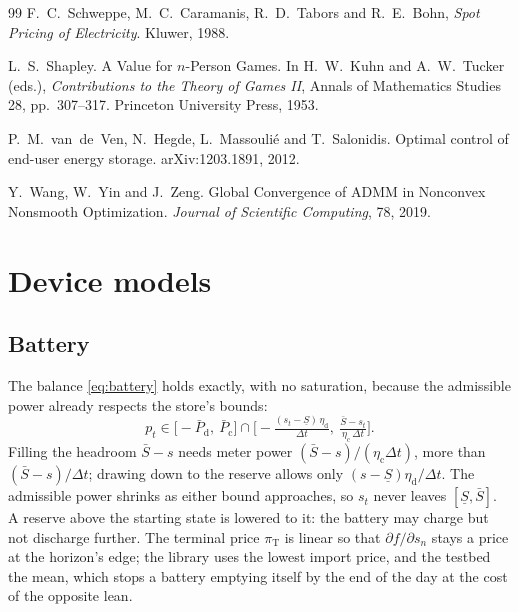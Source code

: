 \documentclass[11pt,a4paper]{article}
\newcommand{\Ec}{\eta_{\mathrm c}}
\newcommand{\Ed}{\eta_{\mathrm d}}
\newcommand{\dt}{\Delta t}
\begin{document}
\begin{thebibliography}{99}
F.~C.~Schweppe, M.~C.~Caramanis, R.~D.~Tabors and R.~E.~Bohn,
\emph{Spot Pricing of Electricity}. Kluwer, 1988.

L.~S.~Shapley.
\newblock A Value for $n$-Person Games.
\newblock In H.~W.~Kuhn and A.~W.~Tucker (eds.), \emph{Contributions to the
Theory of Games II}, Annals of Mathematics Studies 28, pp.~307--317. Princeton
University Press, 1953.

P.~M.~van~de~Ven, N.~Hegde, L.~Massouli\'e and T.~Salonidis.
\newblock Optimal control of end-user energy storage.
\newblock arXiv:1203.1891, 2012.

Y.~Wang, W.~Yin and J.~Zeng.
\newblock Global Convergence of ADMM in Nonconvex Nonsmooth Optimization.
\newblock \emph{Journal of Scientific Computing}, 78, 2019.

\end{thebibliography}

\appendix

\section{Device models}
\label{app:models}

\subsection{Battery}
\label{app:battery}

The balance \eqref{eq:battery} holds exactly, with no saturation, because the
admissible power already respects the store's bounds:
\begin{equation}
  p_t \in \Big[-\bar P_{\mathrm d},\ \bar P_{\mathrm c}\Big] \cap
  \Big[-\tfrac{(s_t - \underline S)\,\Ed}{\dt},\ \tfrac{\bar S - s_t}{\Ec\,\dt}\Big].
  \label{eq:actionset}
\end{equation}
Filling the headroom $\bar S - s$ needs meter power $(\bar S - s)/(\Ec\dt)$,
more than $(\bar S - s)/\dt$; drawing down to the reserve allows only
$(s - \underline S)\Ed/\dt$. The admissible power shrinks as either bound
approaches, so $s_t$ never leaves $[\underline S, \bar S]$. A reserve above the
starting state is lowered to it: the battery may charge but not discharge
further. The terminal price $\pi_{\mathrm T}$ is linear so that $\partial
f/\partial s_n$ stays a price at the horizon's edge; the library uses the lowest
import price, and the testbed the mean, which stops a battery emptying itself by
the end of the day at the cost of the opposite lean.
\end{document}
